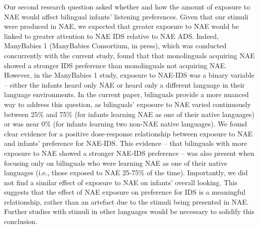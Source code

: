 \documentclass[,man,floatsintext]{apa6}
\begin{document}
Our second research question asked whether and how the amount of exposure to NAE would affect bilingual infants' listening preferences. Given that our stimuli were produced in NAE, we expected that greater exposure to NAE would be linked to greater attention to NAE IDS relative to NAE ADS. Indeed, ManyBabies 1 (ManyBabies Consortium, in press), which was conducted concurrently with the current study, found that that monolinguals acquiring NAE showed a stronger IDS preference than monolinguals not acquiring NAE. However, in the ManyBabies 1 study, exposure to NAE-IDS was a binary variable -- either the infants heard only NAE or heard only a different language in their language environments. In the current paper, bilinguals provide a more nuanced way to address this question, as bilinguals' exposure to NAE varied continuously between 25\% and 75\% (for infants learning NAE as one of their native languages) or was near 0\% (for infants learning two non-NAE native languages). We found clear evidence for a positive dose-response relationship between exposure to NAE and infants' preference for NAE-IDS. This evidence -- that bilinguals with more exposure to NAE showed a stronger NAE-IDS preference -- was also present when focusing only on bilinguals who were learning NAE as one of their native languages (i.e., those exposed to NAE 25-75\% of the time). Importantly, we did not find a similar effect of exposure to NAE on infants' overall looking. This suggests that the effect of NAE exposure on preference for IDS is a meaningful relationship, rather than an artefact due to the stimuli being presented in NAE. Further studies with stimuli in other languages would be necessary to solidify this conclusion.
\end{document}
